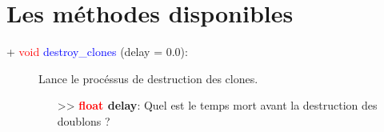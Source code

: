 \documentclass[a4paper, 11pt]{article}
\begin{document}
	\section{Les méthodes disponibles}
	\begin{description}
		\item [+ \textcolor{red}{void} \textcolor{blue}{destroy\_clones} (delay = 0.0):] Lance le procéssus 
		de destruction des clones.
		\begin{itemize}
			\item [>> \textbf{\textcolor{red}{float} delay}:] Quel est le temps mort avant la destruction 
			des doublons ?\\
		\end{itemize}
	\end{description}
\end{document}
